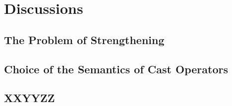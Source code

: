 \section{Discussions}

\subsection{The Problem of Strengthening}

\subsection{Choice of the Semantics of Cast Operators}

\subsection{XXYYZZ}